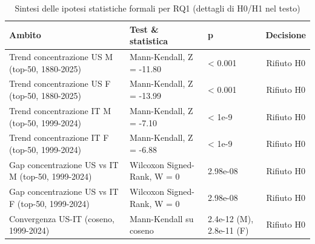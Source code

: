 \begin{table}[t]
\centering
\footnotesize
\caption{Sintesi delle ipotesi statistiche formali per RQ1 (dettagli di H0/H1 nel testo)}
\label{tab:formal_hypotheses}
\begin{tabular}{>{\raggedright\arraybackslash}p{5cm} >{\raggedright\arraybackslash}p{4.5cm} >{\raggedright\arraybackslash}p{3.5cm} c}
\toprule
\textbf{Ambito} & \textbf{Test \& statistica} & \textbf{p} & \textbf{Decisione} \\
\midrule
Trend concentrazione US M (top-50, 1880-2025) & Mann-Kendall, Z = -11.80 & < 0.001 & Rifiuto H0 \\
Trend concentrazione US F (top-50, 1880-2025) & Mann-Kendall, Z = -13.99 & < 0.001 & Rifiuto H0 \\
Trend concentrazione IT M (top-50, 1999-2024) & Mann-Kendall, Z = -7.10 & < 1e-9 & Rifiuto H0 \\
Trend concentrazione IT F (top-50, 1999-2024) & Mann-Kendall, Z = -6.88 & < 1e-9 & Rifiuto H0 \\
Gap concentrazione US vs IT M (top-50, 1999-2024) & Wilcoxon Signed-Rank, W = 0 & 2.98e-08 & Rifiuto H0 \\
Gap concentrazione US vs IT F (top-50, 1999-2024) & Wilcoxon Signed-Rank, W = 0 & 2.98e-08 & Rifiuto H0 \\
Convergenza US-IT (coseno, 1999-2024) & Mann-Kendall su coseno & 2.4e-12 (M), 2.8e-11 (F) & Rifiuto H0 \\
\bottomrule
\end{tabular}
\end{table}
